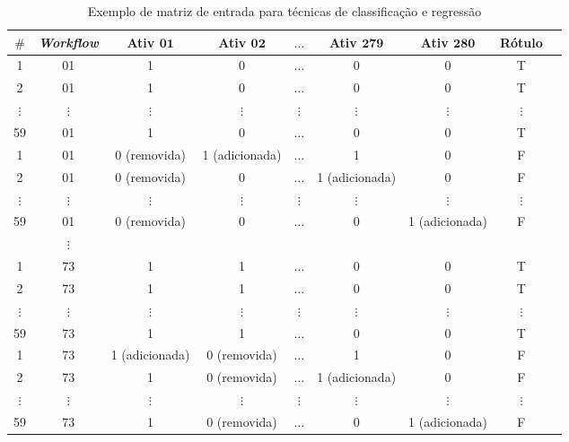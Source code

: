 \begin{table}[!htb]
	\tiny
	\centering
	\caption{Exemplo de matriz de entrada para técnicas de classificação e regressão}
	\begin{tabular}{|c|c|c|c|c|c|c|c|c|}  \hline
\textbf{\(\#\)} & \textbf{\emph{Workflow}} & \textbf{Ativ \(\mathbf{01}\)} & \textbf{Ativ \(\mathbf{02}\)} & \textbf{\(\mathbf{\ldots}\)}  & \textbf{Ativ \(\mathbf{279}\)} & \textbf{Ativ \(\mathbf{280}\)} & \textbf{Rótulo} \\ \hline

1	&		01		 			   & 1 			  & 0 			  & \(\ldots\) 	  & 0 & 0  			& T	\\ \hline
2	&		01 					   & 1 			  & 0 			  & \(\ldots\) 	  & 0 & 0  			& T	\\ \hline
\(\vdots\)  &  \(\vdots\) 	   	   & \(\vdots\)   & \(\vdots\) 	  & \(\vdots\) 	  & \(\vdots\) & \(\vdots\) & \(\vdots\)\\ \hline
59	&		01 					   & 1 			  & 0 			  & \(\ldots\) 	  & 0 & 0   		& T	\\ \hline
1	&		01		 			   & 0 (removida) 		  & 1 (adicionada) &\(\ldots\)& 1 & 0	& F	\\ \hline
2	&		01 					   & 0 (removida)& 0 		  & \(\ldots\) 	  & 1 (adicionada) & 0& F	\\ \hline
\(\vdots\)  &		\(\vdots\) 	   & \(\vdots\) & \(\vdots\) 	  & \(\vdots\) 	  & \(\vdots\) & \(\vdots\) & \(\vdots\) \\ \hline
59	&		01 					   & 0 (removida)			  & 0 			  & \(\ldots\) & 0 & 1 (adicionada)& F \\ \hline
					&\(\vdots\) & & & & & & 																		\\ \hline
1	&		73		 			   & 1 			  & 1  & \(\ldots\) 	  & 0 & 0  			& T	\\ \hline
2	&		73 					   & 1 			  & 1  & \(\ldots\) 	  & 0 & 0  			& T	\\ \hline
\(\vdots\)  &		\(\vdots\) 	   & \(\vdots\)   & \(\vdots\) 	  & \(\vdots\) 	  & \(\vdots\) & \(\vdots\) & \(\vdots\) \\ \hline
59	&		73 					   & 1 			  & 1  & \(\ldots\) 	  & 0 & 0   		& T	\\ \hline
1	&		73		 			   & 1 (adicionada) & 0 (removida)  & \(\ldots\) 	  & 1 & 0   		& F	\\ \hline
2	&		73 					   & 1 			  & 0 (removida)  & \(\ldots\)& 1 (adicionada) & 0  & F	\\ \hline
\(\vdots\)  &		\(\vdots\) 	   & \(\vdots\)   & \(\vdots\) 	  & \(\vdots\) 	  & \(\vdots\) & \(\vdots\) & \(\vdots\)	\\ \hline
59	&		73 					   & 1 			  & 0 (removida)  & \(\ldots\) 	  & 0 & 1 (adicionada) & F	\\ \hline
		\end{tabular}
	\label{tabela_matriz_de_dados_adapatada_classificacao_regressao}
	\vspace{0.1cm}
	\source{\varAutorData}
\end{table}

